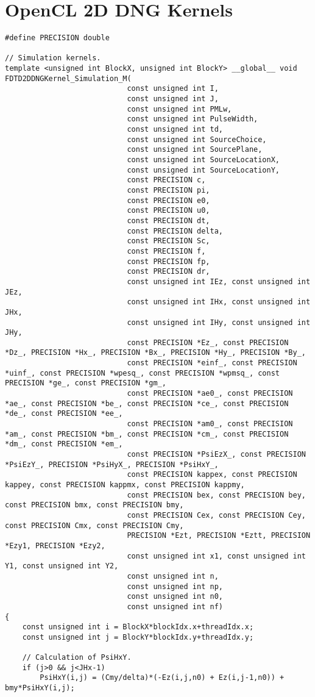 \section{OpenCL 2D DNG Kernels}
\label{App:OpenCL-2D-DNG-Kernels}
\begin{lstlisting}
#define PRECISION double

// Simulation kernels.
template <unsigned int BlockX, unsigned int BlockY> __global__ void FDTD2DDNGKernel_Simulation_M(
							const unsigned int I,
							const unsigned int J,
							const unsigned int PMLw,
							const unsigned int PulseWidth,
							const unsigned int td,
							const unsigned int SourceChoice,
							const unsigned int SourcePlane,
							const unsigned int SourceLocationX,
							const unsigned int SourceLocationY,
							const PRECISION c,
							const PRECISION pi,
							const PRECISION e0,
							const PRECISION u0,
							const PRECISION dt,
							const PRECISION delta,
							const PRECISION Sc,
							const PRECISION f,
							const PRECISION fp,
							const PRECISION dr,
							const unsigned int IEz, const unsigned int JEz,
							const unsigned int IHx, const unsigned int JHx,
							const unsigned int IHy, const unsigned int JHy,
							const PRECISION *Ez_, const PRECISION *Dz_, PRECISION *Hx_, PRECISION *Bx_, PRECISION *Hy_, PRECISION *By_,
							const PRECISION *einf_, const PRECISION *uinf_, const PRECISION *wpesq_, const PRECISION *wpmsq_, const PRECISION *ge_, const PRECISION *gm_,
							const PRECISION *ae0_, const PRECISION *ae_, const PRECISION *be_, const PRECISION *ce_, const PRECISION *de_, const PRECISION *ee_,
							const PRECISION *am0_, const PRECISION *am_, const PRECISION *bm_, const PRECISION *cm_, const PRECISION *dm_, const PRECISION *em_,
							const PRECISION *PsiEzX_, const PRECISION *PsiEzY_, PRECISION *PsiHyX_, PRECISION *PsiHxY_,
							const PRECISION kappex, const PRECISION kappey, const PRECISION kappmx, const PRECISION kappmy,
							const PRECISION bex, const PRECISION bey, const PRECISION bmx, const PRECISION bmy,
							const PRECISION Cex, const PRECISION Cey, const PRECISION Cmx, const PRECISION Cmy,
							PRECISION *Ezt, PRECISION *Eztt, PRECISION *Ezy1, PRECISION *Ezy2,
							const unsigned int x1, const unsigned int Y1, const unsigned int Y2,
							const unsigned int n,
							const unsigned int np,
							const unsigned int n0,
							const unsigned int nf)
{
	const unsigned int i = BlockX*blockIdx.x+threadIdx.x;
	const unsigned int j = BlockY*blockIdx.y+threadIdx.y;

	// Calculation of PsiHxY.
	if (j>0 && j<JHx-1)
		PsiHxY(i,j) = (Cmy/delta)*(-Ez(i,j,n0) + Ez(i,j-1,n0)) + bmy*PsiHxY(i,j);


\end{lstlisting}
